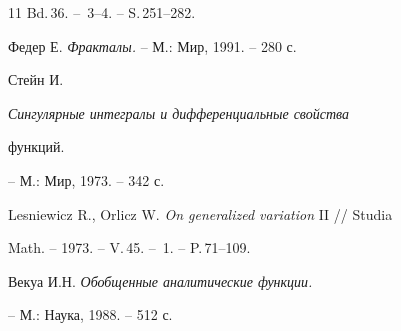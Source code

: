 \begin{thebibliography}{11}
Bd.\,36. -- \No\,3--4. -- S.\,251--282.




Федер Е. {\it Фракталы.} -- М.: Мир, 1991. -- 280 с.




Стейн И. {\it Сингулярные интегралы и дифференциальные свойства


функций.} -- М.: Мир, 1973. -- 342 с.




Lesniewicz R., Orlicz W. {\it On generalized variation} II // Studia


Math. -- 1973. -- V.\,45. -- \No\,1. -- P.\,71--109.




Векуа И.Н. {\it Обобщенные аналитические функции.}


-- М.: Наука, 1988. -- 512 с.





\end{thebibliography}





\vskip 2cm












\label{end}





